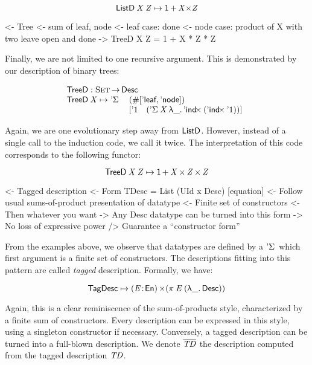 \[    \ListD\: \V{X}\: \V{Z} \mapsto \Unit \mathop{\D{+}} \V{X} \D{\ensuremath{\times}} \V{Z}     \]

\begin{wstructure}
<- Tree
    <- sum of leaf, node
    <- leaf case: done
    <- node case: product of X with two leave open and done
    -> TreeD X Z = 1 + X * Z * Z
\end{wstructure}

Finally, we are not limited to one recursive argument. This is
demonstrated by our description of binary trees:

\[\stk{
\TreeD : \Set \To \Desc \\
\begin{array}{@{}ll}
\TreeD \: \V{X} \mapsto \DSigma{ & (\EnumT{[ \TreeLeaf, \TreeNode ]}) \\}
                           { & [ \DUnit \quad (\DSigma{\V{X}}{\LAM{\_} \DIndx{(\DIndx{\DUnit})}}) ]}
\end{array}
}\]

Again, we are one evolutionary step away from $\ListD$. However,
instead of a single call to the induction code, we call it twice. The
interpretation of this code corresponds to the following functor:

\[    \TreeD\: \V{X}\: \V{Z} \mapsto \Unit \mathop{\D{+}} \V{X} \Prod \V{Z} \Prod \V{Z}     \]


\begin{wstructure}
<- Tagged description
    <- Form TDesc = List (UId x Desc) [equation]
    <- Follow usual sums-of-product presentation of datatype
        <- Finite set of constructors
        <- Then whatever you want
    -> Any Desc datatype can be turned into this form
        -> No loss of expressive power
        /> Guarantee a ``constructor form''
\end{wstructure}

From the examples above, we observe that datatypes are defined by a
$\DSigma{\!}{\!}$ which first argument is a finite set of
constructors. The descriptions fitting into this pattern are called
\emph{tagged} description. Formally, we have:

\[
 \TagDesc \mapsto \SIGMA{\V{E}}{\EnumU} (\spi{\V{E}}{(\LAM{\_} \Desc)})
\]

Again, this is a clear reminiscence of the sum-of-products style,
characterized by a finite sum of constructors. Every description can
be expressed in this style, using a singleton constructor if
necessary. Conversely, a tagged description can be turned into a
full-blown description. We denote $\toDesc{\V{TD}}$ the description
computed from the tagged description $\V{TD}$.

